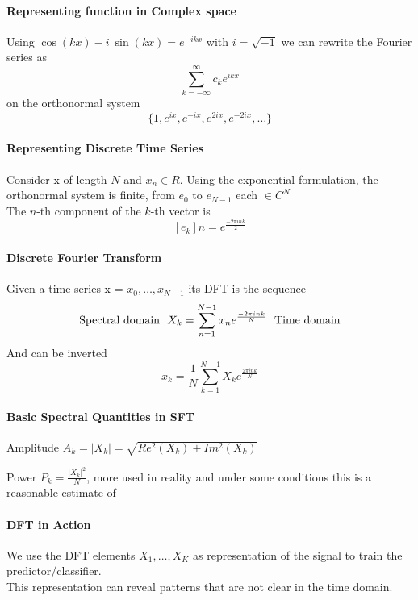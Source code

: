 \documentclass[10pt]{report}
\begin{document}
\paragraph{Representing function in Complex space} Using $\cos(kx)-i\:\sin(kx) = e^{-ikx}$ with $i=\sqrt{-1}$ we can rewrite the Fourier series as $$\sum_{k=-\infty}^\infty c_k e^{ikx}$$
on the orthonormal system $$\{1,e^{ix},e^{-ix},e^{2ix},e^{-2ix},\ldots\}$$
\paragraph{Representing Discrete Time Series} Consider x of length $N$ and $x_n\in R$. Using the exponential formulation, the orthonormal system is finite, from $e_0$ to $e_{N-1}$ each $\in C^N$\\
The $n$-th component of the $k$-th vector is $$[e_k]n=e^{\frac{-2\pi ink}{2}}$$
\paragraph{Discrete Fourier Transform} Given a time series x = $x_0,\ldots,x_{N-1}$ its DFT is the sequence $$\hbox{Spectral domain}\:\:\:X_k = \sum_{n=1}^{N-1}x_ne^{\frac{-2\pi ink}{N}}\:\:\:\hbox{Time domain}$$
And can be inverted $$x_k = \frac{1}{N}\sum_{k=1}^{N-1}X_ke^{\frac{2\pi ink}{N}}$$
\paragraph{Basic Spectral Quantities in SFT}
\begin{list}{}{}
	\item Amplitude $A_k = |X_k| = \sqrt{Re^2(X_k)+Im^2(X_k)}$
	\item Power $P_k = \frac{|X_k|^2}{N}$, more used in reality and under some conditions this is a reasonable estimate of %
\end{list}
\paragraph{DFT in Action} We use the DFT elements $X_1,\ldots,X_K$ as representation of the signal to train the predictor/classifier.\\
This representation can reveal patterns that are not clear in the time domain.
\end{document}
